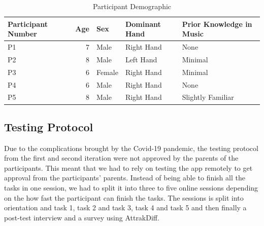 \begin{table}[]
\begin{tabular}{|l|r|l|l|l|}
\hline
Participant Number & \multicolumn{1}{l|}{Age} & Sex    & Dominant Hand & Prior Knowledge in Music \\ \hline
P1      & 7                        & Male   & Right Hand    & None                     \\ \hline
P2      & 8                        & Male   & Left Hand     & Minimal                  \\ \hline
P3      & 6                        & Female & Right Hand    & Minimal                  \\ \hline
P4      & 6                        & Male   & Right Hand     & None                     \\ \hline
P5      & 8                        & Male   & Right Hand    & Slightly Familiar        \\ \hline
\end{tabular}
\caption{Participant Demographic}
\label{tab:ParticipantDemographic}
\end{table}

\subsection{Testing Protocol}
Due to the complications brought by the Covid-19 pandemic, the testing protocol from the first and second iteration were not approved by the parents of the participants. This meant that we had to rely on testing the app remotely to get approval from the participants' parents. Instead of being able to finish all the tasks in one session, we had to split it into three to five online sessions depending on the how fast the participant can finish the tasks. The sessions is split  into orientation and task 1, task 2 and task 3, task 4 and task 5 and then finally a post-test interview and a survey using AttrakDiff.

